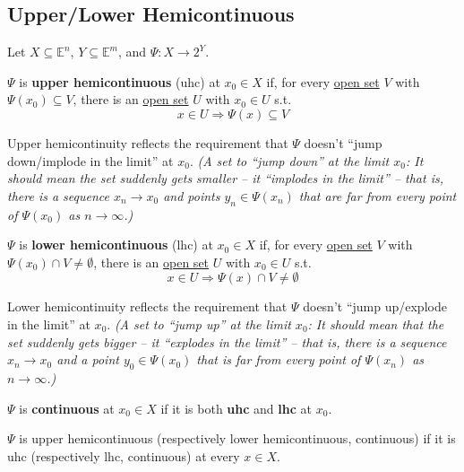 \documentclass[11pt]{elegantbook}
\begin{document}
\subsection{Upper/Lower Hemicontinuous}
Let $X\subseteq \mathbb{E}^n$, $Y\subseteq \mathbb{E}^m$, and $\Psi: X \rightarrow 2^Y$.
\begin{definition}
    \normalfont
    $\Psi$ is \textbf{upper hemicontinuous} (uhc) at $x_0 \in X$ if, for every \underline{open set} $V$ with $\Psi(x_0)\subseteq V$, there is an \underline{open set} $U$ with $x_0 \in U$ s.t.
    $$x\in U \Rightarrow \Psi(x)\subseteq V$$
\end{definition}
Upper hemicontinuity reflects the requirement that $\Psi$ doesn't “jump down/implode in the limit” at $x_0$. \textit{(A set to “jump down” at the limit $x_0$: It should mean the set suddenly gets smaller -- it “implodes in the limit” -- that is, there is a sequence $x_n \rightarrow x_0$ and points $y_n \in \Psi(x_n)$ that are far from every point of $\Psi(x_0)$ as $n \rightarrow \infty$.)}
\begin{definition}
    \normalfont
    $\Psi$ is \textbf{lower hemicontinuous} (lhc) at $x_0 \in X$ if, for every \underline{open set} $V$ with $\Psi(x_0)\cap V \neq \emptyset$, there is an \underline{open set} $U$ with $x_0 \in U$ s.t.
    $$x\in U \Rightarrow \Psi(x)\cap V\neq \emptyset$$
\end{definition}
Lower hemicontinuity reflects the requirement that $\Psi$ doesn't “jump up/explode in the limit” at $x_0$. \textit{(A set to “jump up” at the limit $x_0$: It should mean that the set suddenly gets bigger -- it “explodes in the limit” -- that is, there is a sequence $x_n \rightarrow x_0$ and a point $y_0\in\Psi(x_0)$ that is far from every point of $\Psi(x_n)$ as $n \rightarrow \infty$.)}

\begin{definition}
    \normalfont
    $\Psi$ is \textbf{continuous} at $x_0 \in X$ if it is both \textbf{uhc} and \textbf{lhc} at $x_0$.
\end{definition}

\begin{proposition}
    $\Psi$ is upper hemicontinuous (respectively lower hemicontinuous, continuous) if it is uhc (respectively lhc, continuous) at every $x \in X$.
\end{proposition}
\end{document}
